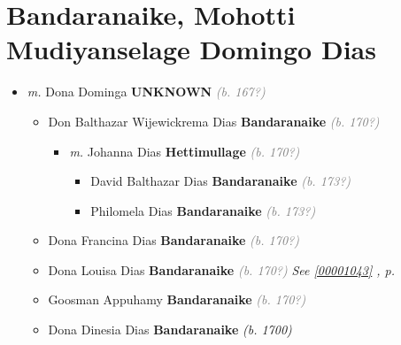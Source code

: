 \documentclass[10pt, openany]{book}
\begin{document}
\chapter{Bandaranaike, Mohotti Mudiyanselage Domingo Dias}
\label{00001035}
\textcolor{slmaroon}{\textit{}}
\begin{itemize}
\item{\textit{m.} Dona Dominga \textbf{UNKNOWN} \textcolor{gray}{\textit{(b. 167?)}}   \label{couple:00001035:00001036} \begin{itemize}
\item{Don Balthazar Wijewickrema Dias \textbf{Bandaranaike} \textcolor{gray}{\textit{(b. 170?)}}
\begin{itemize}
\item{\textit{m.} Johanna Dias \textbf{Hettimullage} \textcolor{gray}{\textit{(b. 170?)}}   \label{couple:00001037:00001041} \begin{itemize}
\item{David Balthazar Dias \textbf{Bandaranaike} \textcolor{gray}{\textit{(b. 173?)}}
   }
\item{Philomela Dias \textbf{Bandaranaike} \textcolor{gray}{\textit{(b. 173?)}}
  }
\end{itemize}}
\end{itemize}
    }
\item{Dona Francina Dias \textbf{Bandaranaike} \textcolor{gray}{\textit{(b. 170?)}}
   }
\item{Dona Louisa Dias \textbf{Bandaranaike} \textcolor{gray}{\textit{(b. 170?)}} \textcolor{slteal}{\textit{See  \autoref{00001043} \textit{, p. \pageref{00001043} }}}}
\item{Goosman Appuhamy \textbf{Bandaranaike} \textcolor{gray}{\textit{(b. 170?)}}
  }
\item{Dona Dinesia Dias \textbf{Bandaranaike} \textcolor{slorange}{\textit{(b. 1700)}}
   }
\end{itemize}}
\end{itemize}
    
\end{document}
